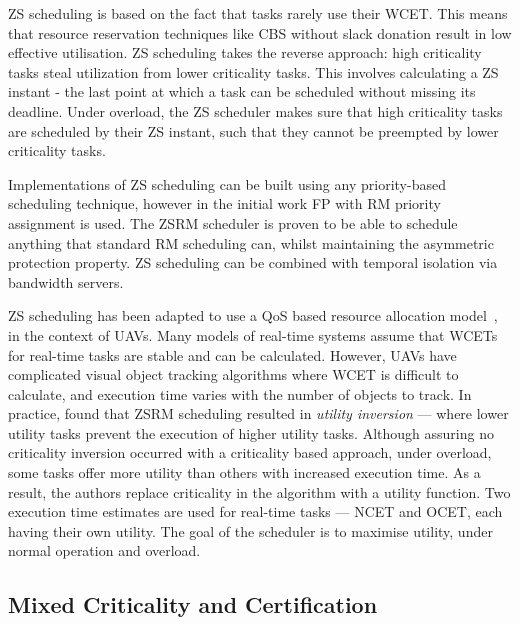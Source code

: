 \gls{ZS} scheduling is based on the fact that tasks rarely use their \gls{WCET}.
This means that resource reservation techniques like \gls{CBS} without slack donation result in low effective utilisation.
ZS scheduling takes the reverse approach: high criticality tasks steal utilization from lower criticality tasks.
This involves calculating a \gls{ZS} instant - the last point at which a task can be scheduled without missing its deadline.
Under overload, the \gls{ZS} scheduler makes sure that high criticality tasks are scheduled by their \gls{ZS} instant, such that they cannot be preempted by lower criticality tasks.

Implementations of \gls{ZS} scheduling can be built using any priority-based scheduling technique, however in the initial work \gls{FP} with \gls{RM} priority assignment is used.
The \gls{ZS}\gls{RM} scheduler is proven to be able to schedule anything that standard \gls{RM} scheduling can, whilst maintaining the asymmetric protection property.
\gls{ZS} scheduling can be combined with temporal isolation via bandwidth servers.

\gls{ZS} scheduling has been adapted to use a \gls{QoS} based resource allocation model~\citep{deNiz_WSRR_12}, in the context of \glspl{UAV}.
Many models of real-time systems assume that \glspl{WCET} for real-time tasks are stable and can be calculated.
However, \glspl{UAV} have complicated visual object tracking algorithms where \gls{WCET} is difficult to calculate, and execution time varies with the number of objects to track.
In practice,  found that \gls{ZS}\gls{RM} scheduling resulted in \emph{utility inversion} --- where lower utility tasks prevent the execution of higher utility tasks.
Although assuring no criticality inversion occurred with a criticality based approach, under overload, some tasks offer more utility than others with increased execution time.
As a result, the authors replace criticality in the algorithm with a utility function.
Two execution time estimates are used for real-time tasks --- \gls{NCET} and \gls{OCET}, each having their own utility.
The goal of the scheduler is to maximise utility, under normal operation and overload.


\subsection{Mixed Criticality and Certification}
\label{sec:multiple-criticality}

